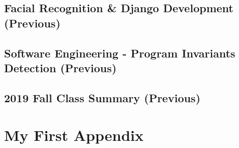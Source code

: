 \documentclass[a4paper,10pt,twoside]{report}
\begin{document}
\section{Facial Recognition \& Django Development (Previous)}


\section{Software Engineering - Program Invariants Detection (Previous)} 


\section{2019 Fall Class Summary (Previous)} 





\newpage

\appendix
{}
\chapter{My First Appendix}\label{chapter:Appendix A}

\end{document}
